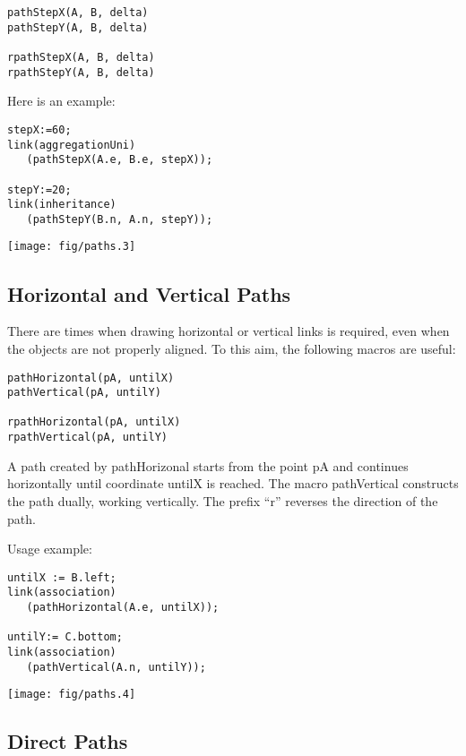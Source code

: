 \documentclass{article}
\newcommand{\code}{\ttfamily}
\begin{document}
\begin{verbatim}
pathStepX(A, B, delta)
pathStepY(A, B, delta)

rpathStepX(A, B, delta)
rpathStepY(A, B, delta)
\end{verbatim}

Here is an example:

\begin{multicols}{2}
\begin{verbatim}
stepX:=60;
link(aggregationUni)
   (pathStepX(A.e, B.e, stepX));

stepY:=20;
link(inheritance)
   (pathStepY(B.n, A.n, stepY));
\end{verbatim}
\columnbreak
\hspace{1cm}\texttt{[image: fig/paths.3]}
\end{multicols}

\subsection{Horizontal and Vertical Paths}

There are times when drawing horizontal or vertical links is required,
even when the objects are not properly aligned. To this aim, the following macros
are useful:

\begin{verbatim}
pathHorizontal(pA, untilX)
pathVertical(pA, untilY)

rpathHorizontal(pA, untilX)
rpathVertical(pA, untilY)
\end{verbatim}

A path created by {\code pathHorizonal} starts from the point {\code pA}
and continues horizontally until coordinate {\code untilX} is reached. The macro
{\code pathVertical} constructs the path dually, working vertically.
The prefix ``{\code r}'' reverses the direction of the path.

Usage example:

\begin{multicols}{2}
\begin{verbatim}
untilX := B.left;
link(association)
   (pathHorizontal(A.e, untilX));

untilY:= C.bottom;
link(association)
   (pathVertical(A.n, untilY));
\end{verbatim}
\columnbreak
\hspace{1cm}\texttt{[image: fig/paths.4]}
\end{multicols}

\subsection{Direct Paths}
\end{document}
